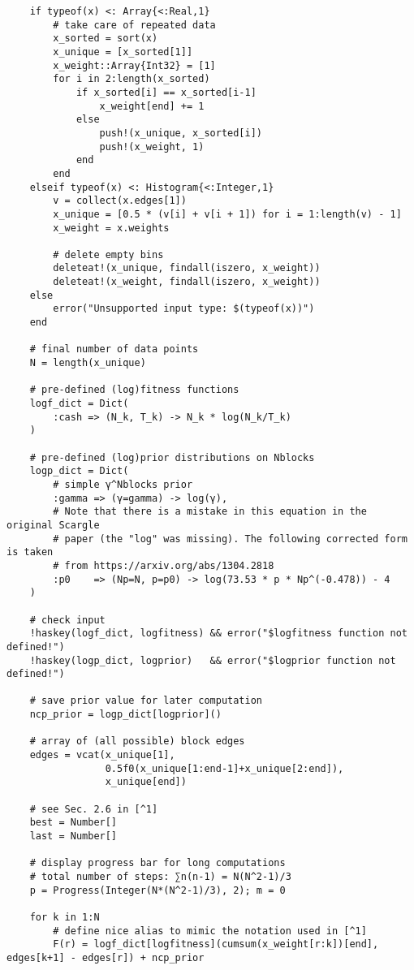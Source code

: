 \begin{lstlisting}
    if typeof(x) <: Array{<:Real,1}
        # take care of repeated data
        x_sorted = sort(x)
        x_unique = [x_sorted[1]]
        x_weight::Array{Int32} = [1]
        for i in 2:length(x_sorted)
            if x_sorted[i] == x_sorted[i-1]
                x_weight[end] += 1
            else
                push!(x_unique, x_sorted[i])
                push!(x_weight, 1)
            end
        end
    elseif typeof(x) <: Histogram{<:Integer,1}
        v = collect(x.edges[1])
        x_unique = [0.5 * (v[i] + v[i + 1]) for i = 1:length(v) - 1]
        x_weight = x.weights

        # delete empty bins
        deleteat!(x_unique, findall(iszero, x_weight))
        deleteat!(x_weight, findall(iszero, x_weight))
    else
        error("Unsupported input type: $(typeof(x))")
    end

    # final number of data points
    N = length(x_unique)

    # pre-defined (log)fitness functions
    logf_dict = Dict(
        :cash => (N_k, T_k) -> N_k * log(N_k/T_k)
    )

    # pre-defined (log)prior distributions on Nblocks
    logp_dict = Dict(
        # simple γ^Nblocks prior
        :gamma => (γ=gamma) -> log(γ),
        # Note that there is a mistake in this equation in the original Scargle
        # paper (the "log" was missing). The following corrected form is taken
        # from https://arxiv.org/abs/1304.2818
        :p0    => (Np=N, p=p0) -> log(73.53 * p * Np^(-0.478)) - 4
    )

    # check input
    !haskey(logf_dict, logfitness) && error("$logfitness function not defined!")
    !haskey(logp_dict, logprior)   && error("$logprior function not defined!")

    # save prior value for later computation
    ncp_prior = logp_dict[logprior]()

    # array of (all possible) block edges
    edges = vcat(x_unique[1],
                 0.5f0(x_unique[1:end-1]+x_unique[2:end]),
                 x_unique[end])

    # see Sec. 2.6 in [^1]
    best = Number[]
    last = Number[]

    # display progress bar for long computations
    # total number of steps: ∑n(n-1) = N(N^2-1)/3
    p = Progress(Integer(N*(N^2-1)/3), 2); m = 0

    for k in 1:N
        # define nice alias to mimic the notation used in [^1]
        F(r) = logf_dict[logfitness](cumsum(x_weight[r:k])[end], edges[k+1] - edges[r]) + ncp_prior


\end{lstlisting}
